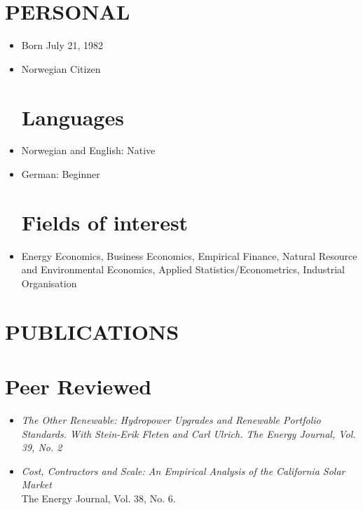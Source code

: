 \documentclass[margin]{res}
\begin{document}

\address{mob:  +47 90 56 64 62 \\ email: johannes.mauritzen@bi.no \\
website:  \url{jmaurit.github.io}}


\begin{resume}
\section{PERSONAL}
\begin{itemize}
\item[] Born July 21, 1982
\item[] Norwegian Citizen

\normalsize{\section{Languages}}
\item[] Norwegian and English: Native
\item[] German: Beginner

\normalsize{\section{Fields of interest}}
\item[] Energy Economics, Business Economics, Empirical Finance, Natural Resource and Environmental Economics, Applied Statistics/Econometrics, Industrial Organisation
\end{itemize}


\section{PUBLICATIONS}

\normalsize{\section{Peer Reviewed}}
\begin{itemize}
\setlength{\itemsep}{10pt}

\item[] \emph{The Other Renewable: Hydropower Upgrades and Renewable Portfolio Standards. With Stein-Erik Fleten and Carl Ulrich. The Energy Journal, Vol. 39, No. 2}

\item[] \emph{Cost, Contractors and Scale: An Empirical Analysis of the California Solar Market}  \\
The Energy Journal, Vol. 38, No. 6.


\end{itemize}
\end{resume}
\end{document}
